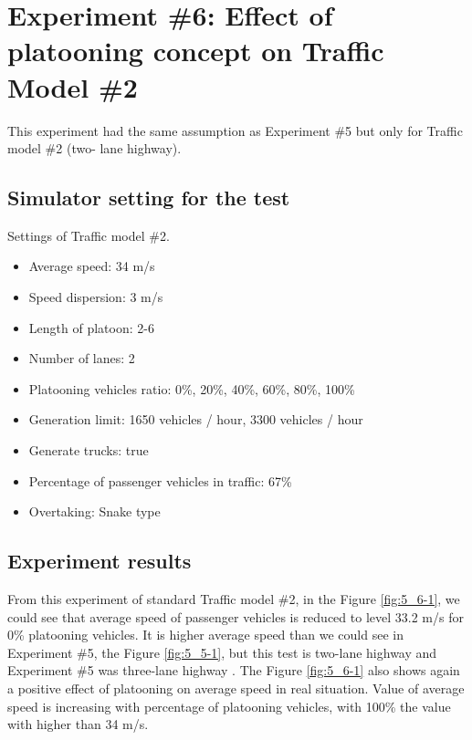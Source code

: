 \newpage
\section[Experiment \#6: Effect of platooning concept on Traffic Model \#2]{Experiment \#6: Effect of platooning concept on Traffic Model \#2}


This experiment had the same assumption as Experiment \#5 but only for Traffic model \#2 (two- lane highway).



\subsection*{Simulator setting for the test}
Settings of Traffic model \#2.
\begin{itemize}
\item Average speed: 34 m/s
\item Speed dispersion: 3 m/s
\item Length of platoon: 2-6
\item Number of lanes:  2
\item Platooning vehicles ratio: 0\%, 20\%, 40\%, 60\%, 80\%, 100\%
\item Generation limit: 1650 vehicles / hour, 3300 vehicles / hour
\item Generate trucks: true
\item Percentage of passenger vehicles in traffic: 67\%
\item Overtaking: Snake type
\end{itemize}



\subsection*{Experiment results}

From this experiment of standard Traffic model \#2, in the Figure \ref{fig:5_6-1}, we could see that average speed of passenger vehicles is reduced to level 33.2 m/s for 0\% platooning vehicles. It is higher  average speed than we could see in Experiment \#5, the Figure \ref{fig:5_5-1}, but this test is two-lane highway and Experiment \#5 was three-lane highway . The Figure \ref{fig:5_6-1} also shows again a positive effect of platooning on average speed in real situation. Value of average speed is increasing with percentage of platooning vehicles, with 100\% the value with higher than 34 m/s.

